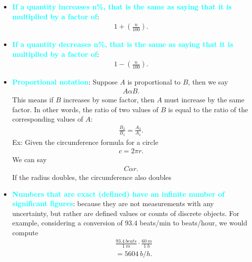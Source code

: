 \documentclass{report}
\begin{document}
\begin{itemize}
\begin{itemize}
            \end{itemize}
        \item \textbf{\textcolor{cyan}{If a quantity increases n\%, that is the same as saying that it is multiplied by a factor of}}:
            \begin{align*}
                1 + \left(\frac{n}{100}\right)
            .\end{align*}
        \item \textbf{\textcolor{cyan}{If a quantity decreases n\%, that is the same as saying that it is multiplied by a factor of}}:
            \begin{align*}
                1 - \left(\frac{n}{100}\right)
            .\end{align*}
        \item \textbf{\textcolor{cyan}{Proportional notation}}: Suppose $A$ is proportional to $B$, then we say
            \begin{align*}
               A \alpha B 
            .\end{align*}
            This means if $B$ increases by some factor, then $A$ must increase by the same factor.
            \bigbreak \noindent 
            In other words, the ratio of two values of $B$ is equal to the ratio of the corresponding values of $A$:
            \begin{align*}
                \frac{B_{2}}{B_{1}} = \frac{A_{2}}{A_{1}}
            .\end{align*}
            \bigbreak \noindent 
            Ex: Given the circumference formula for a circle
            \begin{align*}
               c =2\pi r
            .\end{align*}
            We can say
            \begin{align*}
                C \alpha r
            .\end{align*}
            If the radius doubles, the circumference also doubles
        \item \textbf{\textcolor{cyan}{Numbers that are exact (defined) have an infinite number of significant figures}}: because they are not measurements with any uncertainty, but rather are defined values or counts of discrete objects. For example, considering a conversion of 93.4 beats/min to beats/hour, we would compute
            \begin{align*}
            &\frac{93.4\ beats}{1\ m} \cdot \frac{60\ m}{1\ h} \\
            &=5604\ b/h
            .\end{align*}

\end{itemize}
\end{document}
